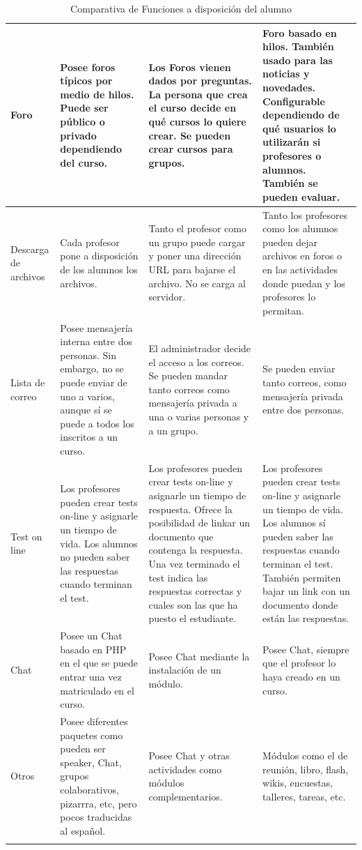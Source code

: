 \begin{center}
\begin{longtable}{| p{} | p{} | p{} | p{} |}
	Foro  & 
	Posee foros típicos por medio de hilos. Puede ser público o privado dependiendo del curso. & 
	Los Foros vienen dados por preguntas. La persona que crea el curso decide en qué cursos lo quiere crear. Se pueden crear cursos para grupos.  & 
	Foro basado en hilos. También usado para las noticias y novedades. Configurable dependiendo de qué usuarios lo utilizarán si profesores o alumnos. También se pueden evaluar.  \\
	\hline
	Descarga de archivos  & 
	Cada profesor pone a disposición de los alumnos los archivos. & 
	Tanto el profesor como un grupo puede cargar y poner una dirección URL para bajarse el archivo. No se carga al servidor. & 
	Tanto los profesores como los alumnos pueden dejar archivos en foros o en las actividades donde puedan y los profesores lo permitan.  \\
	\hline
	Lista de correo & 
	Posee mensajería interna entre dos personas. Sin embargo, no se puede enviar de uno a varios, aunque sí se puede a todos los inscritos a un curso. & 
	El administrador decide el acceso a los correos. Se pueden mandar tanto correos como mensajería privada a una o varias personas y a un grupo. & 
	Se pueden enviar tanto correos, como mensajería privada entre dos personas. \\
	\hline
	Test on line & 
	Los profesores pueden crear tests on-line y asignarle un tiempo de vida. Los alumnos no pueden saber las respuestas cuando terminan el test.& 
	Los profesores pueden crear tests on-line y asignarle un tiempo de respuesta. Ofrece la posibilidad de linkar un documento que contenga la respuesta. Una vez terminado el test indica las respuestas correctas y cuales son las que ha puesto el estudiante. & 
	Los profesores pueden crear tests on-line y asignarle un tiempo de vida. Los alumnos sí pueden saber las respuestas cuando terminan el test. También permiten bajar un link con un documento donde están las respuestas. \\
	\hline
	Chat & 
	Posee un Chat basado en PHP en el que se puede entrar una vez matriculado en el curso. & 
	Posee Chat mediante la instalación de un módulo. & 
	Posee Chat, siempre que el profesor lo haya creado en un curso. \\
	\hline
	Otros & 
	Posee diferentes paquetes como pueden ser speaker, Chat, grupos colaborativos, pizarrra, etc, pero pocos traducidas al español. & 
	Posee Chat y otras actividades como módulos complementarios. & 
	Módulos como el de reunión, libro, flash, wikis, encuestas, talleres, tareas, etc. \\
	\hline

\caption{Comparativa de Funciones a disposición del alumno}
\end{longtable}
\end{center}

